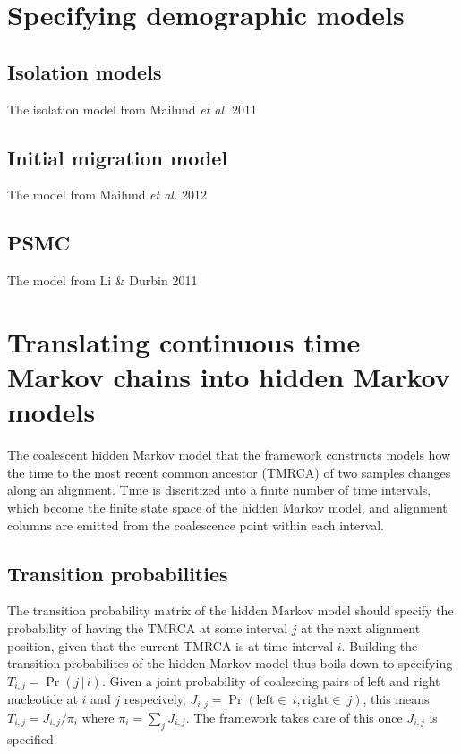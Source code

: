 \documentclass[11pt]{article}
\begin{document}
\section{Specifying demographic models}

\subsection{Isolation models}

The isolation model from Mailund \emph{et al.} 2011 \cite{Mailund:2011dv}

\subsection{Initial migration model}

The model from Mailund \emph{et al.} 2012 \cite{Mailund:2012ew}

\subsection{PSMC}

The model from Li \& Durbin 2011 \cite{Li:2011ez}


\section{Translating continuous time Markov chains into hidden Markov models}

The coalescent hidden Markov model that the framework constructs models how the time to the most recent common ancestor (TMRCA) of two samples changes along an alignment. Time is discritized into a finite number of time intervals, which become the finite state space of the hidden Markov model, and alignment columns are emitted from the coalescence point within each interval.

\subsection{Transition probabilities}

The transition probability matrix of the hidden Markov model should specify the probability of having the TMRCA at some interval $j$ at the next alignment position, given that the current TMRCA is at time interval $i$. Building the transition probabilites of the hidden Markov model thus boils down to specifying $T_{i,j} = \Pr(j\,|\,i)$. Given a joint probability of coalescing pairs of left and right nucleotide at $i$ and $j$ respecively, $J_{i,j} = \Pr(\mathrm{left}\in~i, \mathrm{right}\in~j)$, this means $T_{i,j}=J_{i,j}/\pi_i$ where $\pi_i=\sum_j J_{i,j}$. The framework takes care of this once $J_{i,j}$ is specified.
\end{document}
